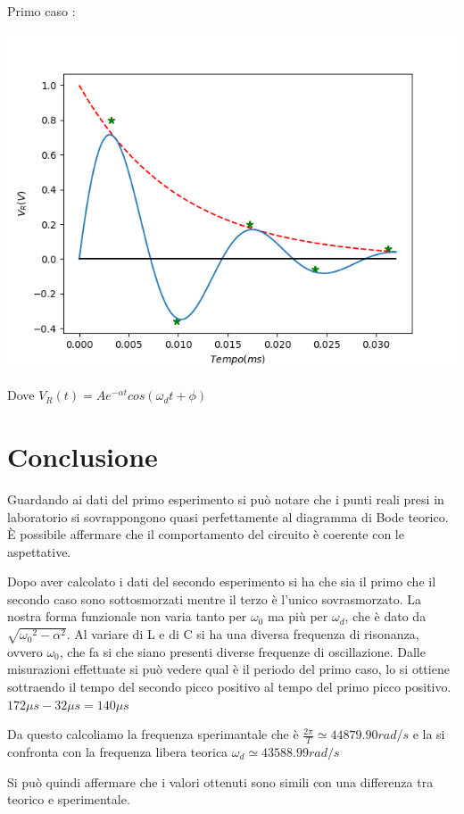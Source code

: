     \hspace{0.5 cm}
    \begin{minipage}{.4\linewidth}
        \hspace{0.5 cm}
        Primo caso : \par
        \includegraphics[width = 9 cm]{secondoese.png}
        \par
        \hspace{0.5 cm} Dove \color{blue} $V_R(t) = Ae^{-\alpha t} cos(\omega_d t + \phi)$
    \end{minipage}

    \section{Conclusione}
    Guardando ai dati del primo esperimento si può notare che i punti reali presi in laboratorio si sovrappongono quasi perfettamente
    al diagramma di Bode teorico. È possibile affermare che il comportamento del circuito è coerente con le aspettative. \par
    Dopo aver calcolato i dati del secondo esperimento si ha che sia il primo che il secondo caso sono sottosmorzati
    mentre il terzo è l'unico sovrasmorzato.
    La nostra forma funzionale non varia tanto per $\omega_0$ ma più per $\omega_d$, che è dato da ${\sqrt{{\omega_0}^{2}-\alpha^{2}}}$.
    Al variare di L e di C si ha una diversa frequenza di risonanza, ovvero $\omega_0$, che fa si che siano presenti
    diverse frequenze di oscillazione.
    Dalle misurazioni effettuate si può vedere qual è il periodo del primo caso, lo si ottiene sottraendo il tempo del secondo picco positivo 
    al tempo del primo picco positivo. $172 \mu s - 32 \mu s = 140 \mu s$ \par
    Da questo calcoliamo la frequenza sperimantale che è
    $\frac{2\pi}{T} \simeq 44879.90 rad/s$ e la si confronta con la frequenza libera teorica $\omega_d \simeq 43588.99 rad/s$ \par
    Si può quindi affermare che i valori ottenuti sono simili con una differenza tra teorico e sperimentale.
    

